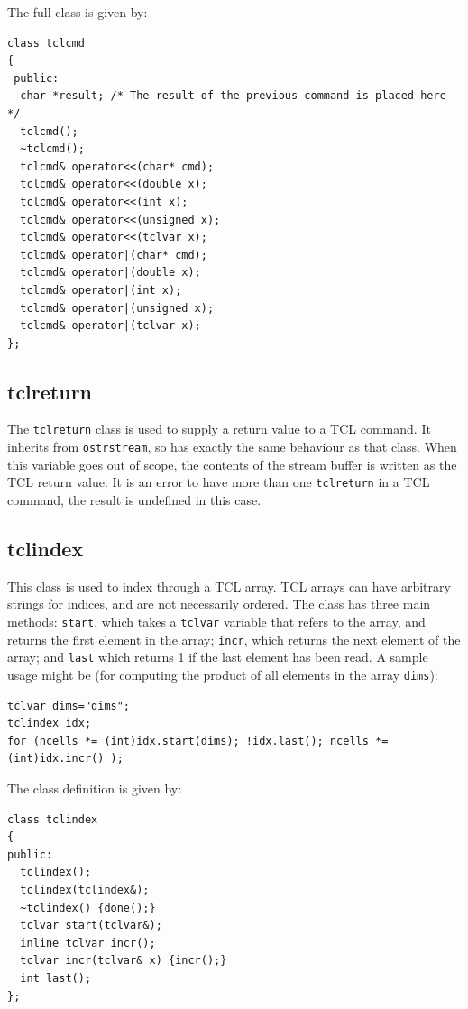 The full class is given by:
\begin{verbatim}
class tclcmd
{
 public:
  char *result; /* The result of the previous command is placed here */
  tclcmd();
  ~tclcmd();
  tclcmd& operator<<(char* cmd);
  tclcmd& operator<<(double x);
  tclcmd& operator<<(int x); 
  tclcmd& operator<<(unsigned x);
  tclcmd& operator<<(tclvar x);
  tclcmd& operator|(char* cmd);
  tclcmd& operator|(double x);
  tclcmd& operator|(int x); 
  tclcmd& operator|(unsigned x);
  tclcmd& operator|(tclvar x);
};
\end{verbatim}

\subsection{tclreturn}

The {\tt tclreturn} class is used to supply a return value to a TCL
command. It inherits from {\tt ostrstream}, so has exactly the same
behaviour as that class. When this variable goes out of scope, the
contents of the stream buffer is written as the TCL return value. It is
an error to have more than one {\tt tclreturn} in a TCL command, the
result is undefined in this case.

\subsection{tclindex}

This class is used to index through a TCL array. TCL arrays can have
arbitrary strings for indices, and are not necessarily ordered. The
class has three main methods: {\tt start}, which takes a {\tt tclvar}
variable that refers to the array, and returns the first element in
the array; {\tt incr}, which returns the next element of the array;
and {\tt last} which returns 1 if the last element has been read. A
sample usage might be (for computing the product of all elements in
the array {\tt dims}):
\begin{verbatim}
tclvar dims="dims";
tclindex idx;
for (ncells *= (int)idx.start(dims); !idx.last(); ncells *= (int)idx.incr() );
\end{verbatim}

The class definition is given by:
\begin{verbatim}
class tclindex  
{
public:
  tclindex();
  tclindex(tclindex&);
  ~tclindex() {done();}
  tclvar start(tclvar&);
  inline tclvar incr();
  tclvar incr(tclvar& x) {incr();}  
  int last();
};
\end{verbatim}





